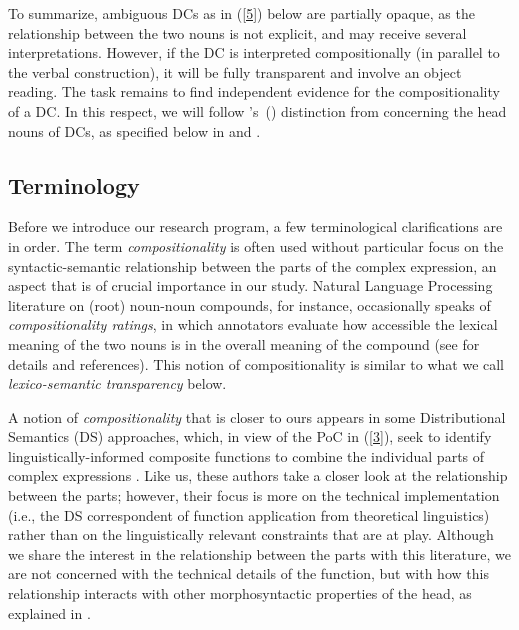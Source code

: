 \documentclass[output=paper]{langsci/langscibook}
\begin{document}
To summarize, ambiguous DCs as in (\ref{5}) below are partially opaque, as the relationship between the two nouns is not explicit, and may receive several interpretations.
However, if the DC is interpreted compositionally (in parallel to the verbal construction), it will be fully transparent and involve an object reading. The task remains to find independent evidence for the compositionality of a DC. In this respect, we will follow \citeauthor{grimshaw:90}'s~(\citeyear{grimshaw:90}) distinction from  concerning the head nouns of DCs, as specified below in  and .

\begin{exe}
\end{exe}


\subsection{Terminology}
 Before we introduce our research program, a few terminological clarifications are in order. The term \textit{compositionality} is often used without particular focus on the syntactic-semantic relationship between the parts of the complex expression, an aspect that is of crucial importance in our study. Natural Language Processing literature on (root) noun-noun compounds, for instance, occasionally speaks of \textit{compositionality ratings}, in which annotators evaluate how accessible the lexical meaning of the two nouns is in the overall meaning of the compound (see  for details and references). This notion of compositionality is similar to what we call \textit{lexico-semantic transparency} below.

 A notion of \textit{compositionality} that is closer to ours appears in some Distributional Semantics (DS) approaches, which, in view of the PoC in (\ref{3}), seek to identify linguistically-informed composite functions to combine the individual parts of complex expressions \citep{marelli:baroni:15,baroni:zamparelli:10}. Like us, these authors take a closer look at the relationship between the parts; however, their focus is more on the technical implementation (i.e., the DS correspondent of function application from theoretical linguistics) rather than on the linguistically relevant constraints that are at play. Although we share the interest in the relationship between the parts with this literature, we are not concerned with the technical details of the function, but with how this relationship interacts with other morphosyntactic properties of the head, as explained in .
\end{document}
